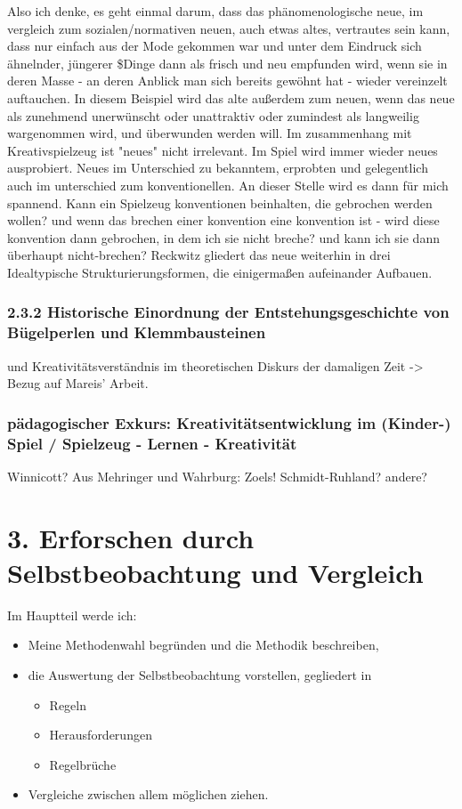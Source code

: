 \documentclass[11pt,a4paper,twoside]{scrreprt}
\begin{document}
Also ich denke, es geht einmal darum, dass das phänomenologische neue, im vergleich zum sozialen/normativen neuen, auch etwas altes, vertrautes sein kann, dass nur einfach aus der Mode gekommen war und unter dem Eindruck sich ähnelnder, jüngerer \$Dinge dann als frisch und neu empfunden wird, wenn sie in deren Masse - an deren Anblick man sich bereits gewöhnt hat - wieder vereinzelt auftauchen.
In diesem Beispiel wird das alte außerdem zum neuen, wenn das neue als zunehmend unerwünscht oder unattraktiv oder zumindest als langweilig wargenommen wird, und überwunden werden will.
Im zusammenhang mit Kreativspielzeug ist "neues" nicht irrelevant. Im Spiel wird immer wieder neues ausprobiert. Neues im Unterschied zu bekanntem, erprobten und gelegentlich auch im unterschied zum konventionellen. An dieser Stelle wird es dann für mich spannend. Kann ein Spielzeug konventionen beinhalten, die gebrochen werden wollen? und wenn das brechen einer konvention eine konvention ist - wird diese konvention dann gebrochen, in dem ich sie nicht breche? und kann ich sie dann überhaupt nicht-brechen?
Reckwitz gliedert das neue weiterhin in drei Idealtypische Strukturierungsformen, die einigermaßen aufeinander Aufbauen. 

		\subsection{2.3.2 Historische Einordnung der Entstehungsgeschichte von Bügelperlen und Klemmbausteinen}

			und Kreativitätsverständnis im theoretischen Diskurs der damaligen Zeit -> Bezug auf Mareis' Arbeit.

		\subsection{pädagogischer Exkurs: Kreativitätsentwicklung im (Kinder-) Spiel / Spielzeug - Lernen - Kreativität}

			Winnicott?
			Aus Mehringer und Wahrburg:
			Zoels!
			Schmidt-Ruhland?
			andere?



\chapter{3. Erforschen durch Selbstbeobachtung und Vergleich}
	Im Hauptteil werde ich:
	\begin{itemize}
		\item Meine Methodenwahl begründen und die Methodik beschreiben,
		\item die Auswertung der Selbstbeobachtung vorstellen, gegliedert in 
		\begin{itemize}
			\item Regeln
			\item Herausforderungen
			\item Regelbrüche
		\end{itemize}
		\item Vergleiche zwischen allem möglichen ziehen.
	\end{itemize}
\end{document}
